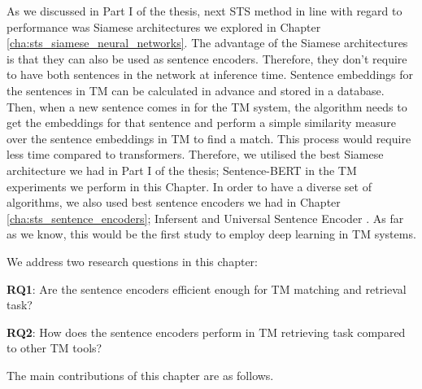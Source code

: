 As we discussed in Part I of the thesis, next STS method in line with regard to performance was Siamese architectures we explored in Chapter \ref{cha:sts_siamese_neural_networks}. The advantage of the Siamese architectures is that they can also be used as sentence encoders. Therefore, they don't require to have both sentences in the network at inference time. Sentence embeddings for the sentences in TM can be calculated in advance and stored in a database. Then, when a new sentence comes in for the TM system, the algorithm needs to get the embeddings for that sentence and perform a simple similarity measure over the sentence embeddings in TM to find a match. This process would require less time compared to transformers. Therefore, we utilised the best Siamese architecture we had in Part I of the thesis; Sentence-BERT \cite{reimers-gurevych-2019-sentence} in the TM experiments we perform in this Chapter. In order to have a diverse set of algorithms, we also used best sentence encoders we had in Chapter \ref{cha:sts_sentence_encoders}; Infersent \cite{conneau-EtAl:2017:EMNLP2017} and Universal Sentence Encoder \cite{cer2018universal}. As far as we know, this would be the first study to employ deep learning in TM systems. 

We address two research questions in this chapter:

\textbf{RQ1}: Are the sentence encoders efficient enough for TM matching and retrieval task?

\textbf{RQ2}: How does the sentence encoders perform in TM retrieving task compared to other TM tools?

The main contributions of this chapter are as follows.


